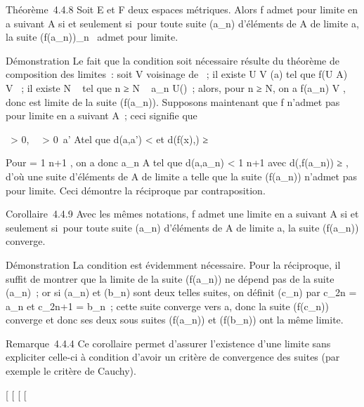 \documentclass[]{article}
\begin{document}
Théorème~4.4.8 Soit E et F deux espaces métriques. Alors f admet \ell pour
limite en a suivant A si et seulement si~pour toute suite (a\_n)
d'éléments de A de limite a, la suite (f(a\_n))\_n\in{}~
admet \ell pour limite.

Démonstration Le fait que la condition soit nécessaire résulte du
théorème de composition des limites~: soit V voisinage de \ell~; il existe
U \in V (a) tel que f(U \bigcap A) \subset~ V ~; il existe N \in {}~ tel que n ≥ N \rigtharrow~
a\_n \in U(\bigcapA)~; alors, pour n ≥ N, on a f(a\_n) \in V ,
donc \ell est limite de la suite (f(a\_n)). Supposons maintenant
que f n'admet pas \ell pour limite en a suivant A~; ceci signifie que

\exists~\epsilon \textgreater{} 0,
\forall~~\eta \textgreater{}
0\exists~a' \in A\text tel que
d(a,a') \textless{} \eta\text et d(f(x),\ell) ≥ \epsilon

Pour \eta = 1 \over n+1 , on a donc a\_n \in A tel
que d(a,a\_n) \textless{} 1 \over n+1 avec
d(\ell,f(a\_n)) ≥ \epsilon, d'où une suite d'éléments de A de limite a
telle que la suite (f(a\_n)) n'admet pas \ell pour limite. Ceci
démontre la réciproque par contraposition.

Corollaire~4.4.9 Avec les mêmes notations, f admet une limite en a
suivant A si et seulement si~pour toute suite (a\_n) d'éléments
de A de limite a, la suite (f(a\_n)) converge.

Démonstration La condition est évidemment nécessaire. Pour la
réciproque, il suffit de montrer que la limite de la suite
(f(a\_n)) ne dépend pas de la suite (a\_n)~; or si
(a\_n) et (b\_n) sont deux telles suites, on définit
(c\_n) par c\_2n = a\_n et c\_2n+1 =
b\_n~; cette suite converge vers a, donc la suite
(f(c\_n)) converge et donc ses deux sous suites
(f(a\_n)) et (f(b\_n)) ont la même limite.

Remarque~4.4.4 Ce corollaire permet d'assurer l'existence d'une limite
sans expliciter celle-ci à condition d'avoir un critère de convergence
des suites (par exemple le critère de Cauchy).

{[}
{[}
{[}
{[}
\end{document}
